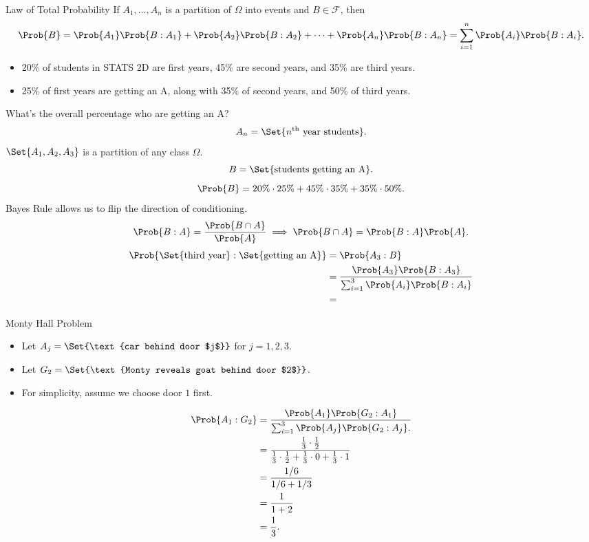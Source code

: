 \begin{Theorem}{Law of Total Probability}{}
    If $ A_1,\ldots,A_n $ is a partition of $ \Omega $ into events
    and $ B\in \mathcal{F} $, then
    \[ \Prob{B}=\Prob{A_1}\Prob{B\given A_1}+
        \Prob{A_2}\Prob{B\given A_2}+\cdots+\Prob{A_n}\Prob{B\given A_n}
        =\sum_{i=1}^{n}\Prob{A_i}\Prob{B\given A_i}. \]
\end{Theorem}
\begin{Example}{}{}
    \begin{itemize}
        \item 20\% of students in STATS 2D are first
              years, 45\% are second years, and
              35\% are third years.
        \item 25\% of first years are getting an A,
              along with 35\% of second years, and 50\% of third years.
    \end{itemize}
    What's the overall percentage who are getting an A\@?
    \[ A_n=\Set{n\textsuperscript{th}\text{ year students}}. \]
    $ \Set{A_1,A_2,A_3} $ is a partition of any class $ \Omega $.
    \[ B=\Set{\text{students getting an A}}. \]
    \[ \Prob{B}=20\%\cdot 25\%+45\%\cdot 35\%+35\%\cdot 50\%. \]
    Bayes Rule allows us to flip the direction of conditioning.
    \[ \Prob{B\given A}=\frac{\Prob{B\cap A}}{\Prob{A}}
        \implies \Prob{B\cap A}=\Prob{B\given A}\Prob{A}. \]
    \begin{align*}
        \Prob{\Set{\text{third year}}\given \Set{\text{getting an A}}}
         & =\Prob{A_3\given B}                                                              \\
         & =\frac{\Prob{A_3}\Prob{B\given A_3}}{\sum_{i=1}^{3}\Prob{A_i}\Prob{B\given A_i}} \\
         & =
    \end{align*}
\end{Example}
\begin{Example}{Monty Hall Problem}{}
    \begin{itemize}
        \item Let $ A_j=\Set{\text{car behind door $j$}} $ for $ j=1,2,3 $.
        \item Let $ G_2=\Set{\text{Monty reveals goat behind door $2$}} $.
        \item For simplicity, assume we choose door $1$ first.
    \end{itemize}
    \begin{align*}
        \Prob{A_1\given G_2}
         & =\frac{\Prob{A_1}\Prob{G_2\given A_1}}{
            \sum_{i=1}^{3}\Prob{A_j}\Prob{G_2\given A_j}.
        }                                          \\
         & =\frac{\frac{1}{3}\cdot \frac{1}{2}}{
            \frac{1}{3}\cdot \frac{1}{2}+\frac{1}{3}\cdot 0+\frac{1}{3}\cdot 1
        }                                          \\
         & =\frac{1/6}{1/6+1/3}                    \\
         & =\frac{1}{1+2}                          \\
         & =\frac{1}{3}.
    \end{align*}
\end{Example}
